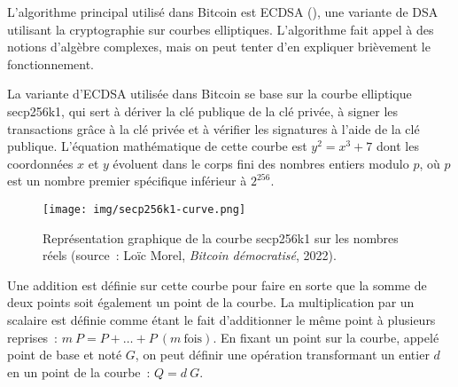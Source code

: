 L'algorithme principal utilisé dans Bitcoin est ECDSA (), une variante de DSA utilisant la cryptographie sur courbes elliptiques. L'algorithme fait appel à des notions d'algèbre complexes, mais on peut tenter d'en expliquer brièvement le fonctionnement.

La variante d'ECDSA utilisée dans Bitcoin se base sur la courbe elliptique secp256k1, qui sert à dériver la clé publique de la clé privée, à signer les transactions grâce à la clé privée et à vérifier les signatures à l'aide de la clé publique. L'équation mathématique de cette courbe est $y^2 = x^3 + 7$ dont les coordonnées $x$ et $y$ évoluent dans le corps fini des nombres entiers modulo $p$, où $p$ est un nombre premier spécifique inférieur à $2^{256}$.

\begin{figure}[h]
  \centering
  \texttt{[image: img/secp256k1-curve.png]}
  \caption{Représentation graphique de la courbe secp256k1 sur les nombres réels (source~: Loïc Morel, \emph{Bitcoin démocratisé}, 2022).}
  \label{fig:secp256k1}
\end{figure}

Une addition est définie sur cette courbe pour faire en sorte que la somme de deux points soit également un point de la courbe. La multiplication par un scalaire est définie comme étant le fait d'additionner le même point à plusieurs reprises~: $m~P = P + \ldots + P~(m~\mathrm{fois})$. En fixant un point sur la courbe, appelé point de base et noté $G$, on peut définir une opération transformant un entier $d$ en un point de la courbe~: $Q = d~G$.

